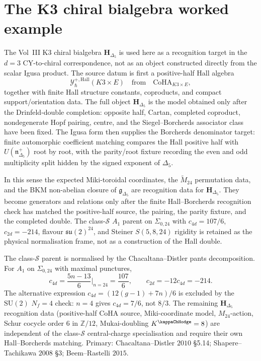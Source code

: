 \section{The K3 chiral bialgebra worked example}
\label{sec:examples-supplement}

\begin{remark}
\label{rem:ex-K3-chiral-bialgebra}
The Vol~III K3 chiral bialgebra $\mathbf{H}_{\Delta_5}$ is used here as
a recognition target in the $d = 3$ CY-to-chiral correspondence, not as
an object constructed directly from the scalar Igusa product.  The
source datum is first a positive-half Hall algebra
\[
 \mathcal Y^{+,\mathrm{Hall}}_\hbar(K3\times E)
 \quad\text{from}\quad
 \mathrm{CoHA}_{K3\times E},
\]
together with finite Hall structure constants, coproducts, and compact
support/orientation data.  The full object
$\mathbf{H}_{\Delta_5}$ is the model obtained only after the
Drinfeld-double completion: opposite half, Cartan, completed coproduct,
nondegenerate Hopf pairing, centre, and the
Siegel--Borcherds associator class have been fixed.  The Igusa form
then supplies the Borcherds denominator target: finite automorphic
coefficient matching compares the Hall positive half with
$U(\mathfrak n^+_{\Delta_5})$ root by root, with the
parity/root fixture recording the even and odd multiplicity split
hidden by the signed exponent of $\Delta_5$.

In this sense the expected Miki-toroidal coordinates, the
$\widetilde M_{24}$ permutation data, and the BKM non-abelian closure of
$\mathfrak g_{\Delta_5}$ are recognition data for
$\mathbf{H}_{\Delta_5}$.  They become generators and relations only
after the finite Hall--Borcherds recognition check has matched the
positive-half source, the pairing, the parity fixture, and the completed
double.  The class-$\mathcal S$ $A_1$ parent on $\Sigma_{0,24}$ with
$c_{4d}=107/6$, $c_{2d}=-214$, flavour $\mathfrak{su}(2)^{24}$, and
Steiner $S(5,8,24)$ rigidity is retained as the physical normalisation
frame, not as a construction of the Hall double.
\end{remark}

\begin{remark}
\label{rem:ex-k3-central-charge-normalization}
The class-$\mathcal S$ parent is normalised by the Chacaltana--Distler
pants decomposition. For \(A_1\) on \(\Sigma_{0,24}\) with maximal
punctures,
\[
 c_{4d}=\frac{5n-13}{6}\Big|_{n=24}=\frac{107}{6},
 \qquad
 c_{2d}=-12c_{4d}=-214.
\]
The alternative expression \(c_{4d}=(12(g-1)+7n)/6\) is excluded by the
\(\mathrm{SU}(2)\) \(N_f=4\) check: \(n=4\) gives \(c_{4d}=7/6\), not
\(8/3\). The remaining $\mathbf{H}_{\Delta_5}$ recognition data
\textup{(}positive-half CoHA source, Miki-coordinate model,
$M_{24}$-action, Schur cocycle order 6 in $\mathbb{Z}/12$,
Mukai-doubling $K^{\kappaChHodge}=8$\textup{)} are independent
of the class-$\mathcal{S}$ central-charge specialisation and require
their own Hall--Borcherds matching. Primary: Chacaltana--Distler $2010$ \S 5.14;
Shapere--Tachikawa $2008$ \S 3; Beem--Rastelli $2015$.
\end{remark}

